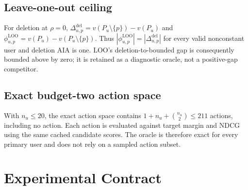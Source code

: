 \documentclass[manuscript,screen,review,anonymous]{acmart}
\begin{document}
\subsection{Leave-one-out ceiling}
For deletion at $\rho=0$, $\Delta^{\mathrm{del}}_{u,p}=v(P_u\setminus\{p\})-v(P_u)$ and $\phi^{\mathrm{LOO}}_{u,p}=v(P_u)-v(P_u\setminus\{p\})$. Thus $|\phi^{\mathrm{LOO}}_{u,p}|=|\Delta^{\mathrm{del}}_{u,p}|$ for every valid nonconstant user and deletion AIA is one. LOO's deletion-to-bounded gap is consequently bounded above by zero; it is retained as a diagnostic oracle, not a positive-gap competitor.

\subsection{Exact budget-two action space}
With $n_u\le20$, the exact action space contains $1+n_u+\binom{n_u}{2}\le211$ actions, including no action. Each action is evaluated against target margin and NDCG using the same cached candidate scores. The oracle is therefore exact for every primary user and does not rely on a sampled action subset.

\FloatBarrier
\section{Experimental Contract}\label{app:contract}
\setcounter{table}{0}
\end{document}
